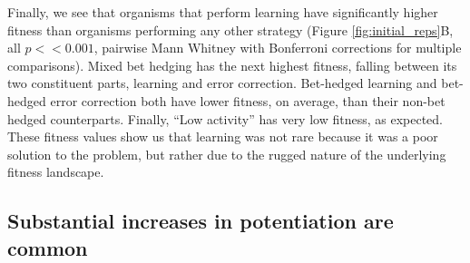 Finally, we see that organisms that perform learning have significantly higher fitness than organisms performing any other strategy (Figure \ref{fig:initial_reps}B, all $p << 0.001$, pairwise Mann Whitney with Bonferroni corrections for multiple comparisons). 
Mixed bet hedging has the next highest fitness, falling between its two constituent parts, learning and error correction. 
Bet-hedged learning and bet-hedged error correction both have lower fitness, on average, than their non-bet hedged counterparts. 
Finally, ``Low activity'' has very low fitness, as expected. 
These fitness values show us that learning was not rare because it was a poor solution to the problem, but rather due to the rugged nature of the underlying fitness landscape.

\subsection{Substantial increases in potentiation are common}



